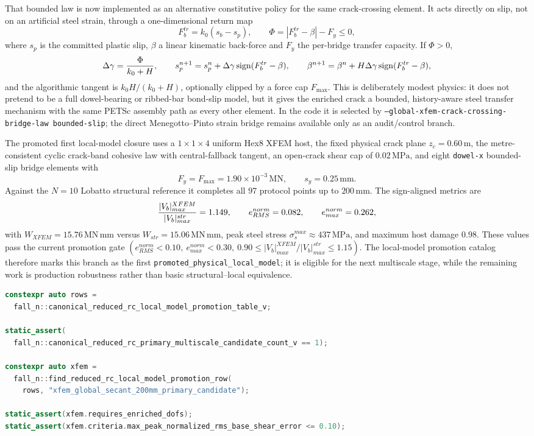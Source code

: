 That bounded law is now implemented as an alternative constitutive policy for
the same crack-crossing element.  It acts directly on slip, not on an artificial
steel strain, through a one-dimensional return map
\[
  F_b^{tr}=k_0(s_b-s_p),\qquad
  \Phi=\left|F_b^{tr}-\beta\right|-F_y\le0,
\]
where \(s_p\) is the committed plastic slip, \(\beta\) a linear kinematic
back-force and \(F_y\) the per-bridge transfer capacity.  If
\(\Phi>0\),
\[
  \Delta\gamma={\Phi\over k_0+H},\qquad
  s_p^{n+1}=s_p^n+\Delta\gamma\,\mathrm{sign}(F_b^{tr}-\beta),\qquad
  \beta^{n+1}=\beta^n+H\Delta\gamma\,\mathrm{sign}(F_b^{tr}-\beta),
\]
and the algorithmic tangent is \(k_0H/(k_0+H)\), optionally clipped by a
force cap \(F_{\max}\).  This is deliberately modest physics: it does not
pretend to be a full dowel-bearing or ribbed-bar bond-slip model, but it gives
the enriched crack a bounded, history-aware steel transfer mechanism with the
same PETSc assembly path as every other element.  In the code it is selected by
\texttt{--global-xfem-crack-crossing-bridge-law bounded-slip}; the direct
Menegotto--Pinto strain bridge remains available only as an audit/control
branch.

The promoted first local-model closure uses a \(1\times1\times4\) uniform Hex8
XFEM host, the fixed physical crack plane \(z_c=0.60\,\mathrm{m}\), the
metre-consistent cyclic crack-band cohesive law with central-fallback tangent,
an open-crack shear cap of \(0.02\,\mathrm{MPa}\), and eight
\texttt{dowel-x} bounded-slip bridge elements with
\[
  F_y=F_{\max}=1.90\times10^{-3}\,\mathrm{MN},\qquad
  s_y=0.25\,\mathrm{mm}.
\]
Against the \(N=10\) Lobatto structural reference it completes all \(97\)
protocol points up to \(200\,\mathrm{mm}\).  The sign-aligned metrics are
\[
  { |V_b|^{XFEM}_{max}\over |V_b|^{str}_{max}}=1.149,\qquad
  e_{RMS}^{norm}=0.082,\qquad
  e_{max}^{norm}=0.262,
\]
with \(W_{XFEM}=15.76\,\mathrm{MN\,mm}\) versus
\(W_{str}=15.06\,\mathrm{MN\,mm}\), peak steel stress
\(\sigma_s^{max}\approx437\,\mathrm{MPa}\), and maximum host damage \(0.98\).
These values pass the current promotion gate
\((e_{RMS}^{norm}<0.10,\ e_{max}^{norm}<0.30,\ 0.90\le
|V_b|^{XFEM}_{max}/|V_b|^{str}_{max}\le1.15)\).  The local-model promotion
catalog therefore marks this branch as the first
\texttt{promoted\_physical\_local\_model}; it is eligible for the next
multiscale stage, while the remaining work is production robustness rather
than basic structural--local equivalence.

\begin{lstlisting}[language=C++,caption={Compile-time promotion gate for the reduced RC local-model campaign.},label={lst:validation-reboot-local-model-promotion-catalog}]
constexpr auto rows =
  fall_n::canonical_reduced_rc_local_model_promotion_table_v;

static_assert(
  fall_n::canonical_reduced_rc_primary_multiscale_candidate_count_v == 1);

constexpr auto xfem =
  fall_n::find_reduced_rc_local_model_promotion_row(
    rows, "xfem_global_secant_200mm_primary_candidate");

static_assert(xfem.requires_enriched_dofs);
static_assert(xfem.criteria.max_peak_normalized_rms_base_shear_error <= 0.10);
\end{lstlisting}

